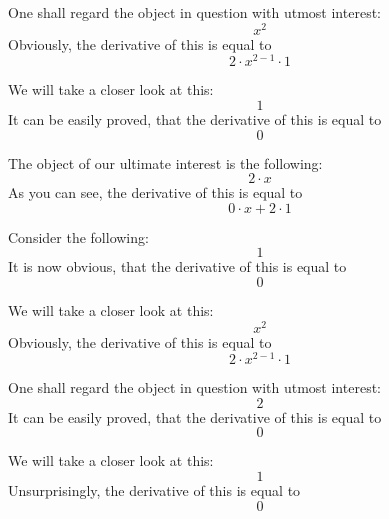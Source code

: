 \documentclass{article}
\begin{document}
One shall regard the object in question with utmost interest:
\begin{equation}
x ^{2 } 
\end{equation}
Obviously, the derivative of this is equal to
\begin{equation}
2 \cdot x ^{2 - 1 } \cdot 1 
\end{equation}

We will take a closer look at this:
\begin{equation}
1 
\end{equation}
It can be easily proved, that the derivative of this is equal to
\begin{equation}
0 
\end{equation}

The object of our ultimate interest is the following:
\begin{equation}
2 \cdot x 
\end{equation}
As you can see, the derivative of this is equal to
\begin{equation}
0 \cdot x + 2 \cdot 1 
\end{equation}

Consider the following:
\begin{equation}
1 
\end{equation}
It is now obvious, that the derivative of this is equal to
\begin{equation}
0 
\end{equation}

We will take a closer look at this:
\begin{equation}
x ^{2 } 
\end{equation}
Obviously, the derivative of this is equal to
\begin{equation}
2 \cdot x ^{2 - 1 } \cdot 1 
\end{equation}

One shall regard the object in question with utmost interest:
\begin{equation}
2 
\end{equation}
It can be easily proved, that the derivative of this is equal to
\begin{equation}
0 
\end{equation}

We will take a closer look at this:
\begin{equation}
1 
\end{equation}
Unsurprisingly, the derivative of this is equal to
\begin{equation}
0 
\end{equation}
\end{document}
